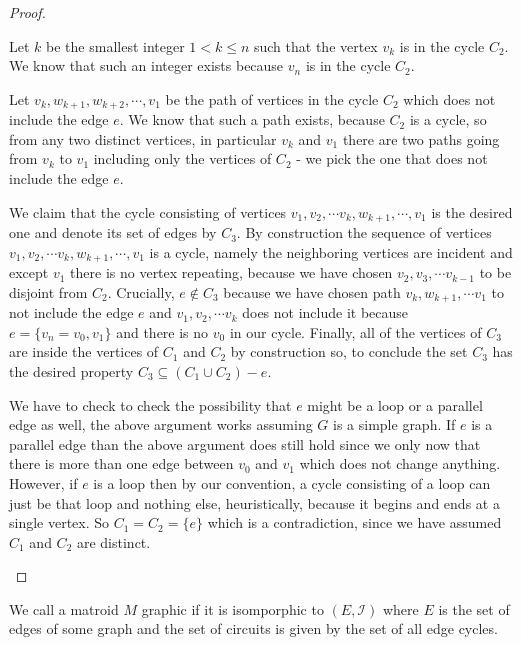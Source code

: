 \begin{proof}
\begin{enumerate}
    Let $k$ be the smallest integer $1<k\leq n$ such that the vertex $v_k$ is in the cycle $C_2$. We know that such an integer exists because $v_n$ is in the cycle $C_2$. 
    
    Let $v_k, w_{k+1}, w_{k+2}, \cdots, v_1$ be the path of vertices in the cycle $C_2$ which does not include the edge $e$. We know that such a path exists, because $C_2$ is a cycle, so from any two distinct vertices, in particular $v_k$ and $v_1$ there are two paths going from $v_k$ to $v_1$ including only the vertices of $C_2$ - we pick the one that does not include the edge $e$.
    
    We claim that the cycle consisting of vertices $v_1, v_2, \cdots v_k, w_{k+1}, \cdots , v_1$ is the desired one and denote its set of edges by $C_3$. By construction the sequence of vertices $v_1, v_2, \cdots v_k, w_{k+1}, \cdots , v_1$ is a cycle, namely the neighboring vertices are incident and except $v_1$ there is no vertex repeating, because we have chosen $v_2, v_3, \cdots v_{k-1}$ to be disjoint from $C_2$. Crucially, $e \notin C_3$ because we have chosen path $v_k, w_{k+1}, \cdots v_1$ to not include the edge $e$ and $v_1, v_2, \cdots v_k$ does not include it because $e = \{v_n = v_0, v_1\}$ and there is no $v_0$ in our cycle. Finally, all of the vertices of $C_3$ are inside the vertices of $C_1$ and $C_2$ by construction so, to conclude the set $C_3$ has the desired property $C_3 \subseteq (C_1 \cup C_2) - e$.
    
    We have to check to check the possibility that $e$ might be a loop or a parallel edge as well, the above argument works assuming $G$ is a simple graph. If $e$ is a parallel edge than the above argument does still hold since we only now that there is more than one edge between $v_0$
    and $v_1$ which does not change anything. However, if $e$ is a loop then by our convention, a cycle consisting of a loop can just be that loop and nothing else, heuristically, because it begins and ends at a single vertex. So $C_1 = C_2 = \{e\}$ which is a contradiction, since we have assumed $C_1$ and $C_2$ are distinct.

\end{enumerate}

\end{proof}

\begin{defn}
    We call a matroid $M$ graphic if it is isomporphic to $(E, \mathcal{I})$ where $E$ is the set of edges of some graph and the set of circuits is given by the set of all edge cycles.
\end{defn}

